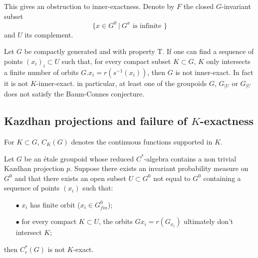 This gives an obstruction to inner-exactness. Denote by $F$ the closed $G$-invariant subset 
\[\{x\in G^0 \ | \ G^x \text{ is infinite }\}\]
and $U$ its complement.\\

\begin{thm}
Let $G$ be compactly generated and with property T. If one can find a sequence of points $(x_i)_i\subset U$ such that, for every compact subset $K \subset G$, $K$ only intersects a finite number of orbits $G.x_i = r(s^{-1}(x_i))$, then $G$ is not inner-exact. In fact it is not $K$-inner-exact. in particular, at least one of the groupoids $G$, $G_{|U}$ or $G_{|U}$ does not satisfy the Baum-Connes conjecture.
\end{thm}

\subsection{Kazdhan projections and failure of $K$-exactness}

For $K\subset G$, $C_K(G)$ denotes the continuous functions supported in $K$. 

\begin{thm}
Let $G$ be an \'etale groupoid whose reduced $C^*$-algebra contains a non trivial Kazdhan projection $p$. Suppose there exists an invariant probability measure on $G^0$ and that there exists an open subset $U\subset G^0$ not equal to $G^0$ containing a sequence of points $(x_i)$ such that:
\begin{itemize}
\item[$\bullet$] $x_i$ has finite orbit ($x_i \in G^0_{fin}$);
\item[$\bullet$] for every compact $K\subset U$, the orbits $Gx_i= r(G_{x_i})$ ultimately don't intersect $K	$;
\end{itemize}
then $C^*_r(G)$ is not $K$-exact.
\end{thm}

